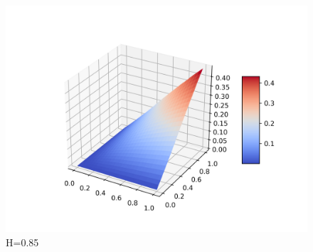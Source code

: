 \documentclass[a4paper,12pt]{article}
\numberwithin{equation}{section}
\begin{document}
	\begin{figure}[H]
		\center
		\includegraphics[scale=0.4]{covariance-2-85.png}
		\caption{H=0.85}
	\end{figure}
	
\end{document}
